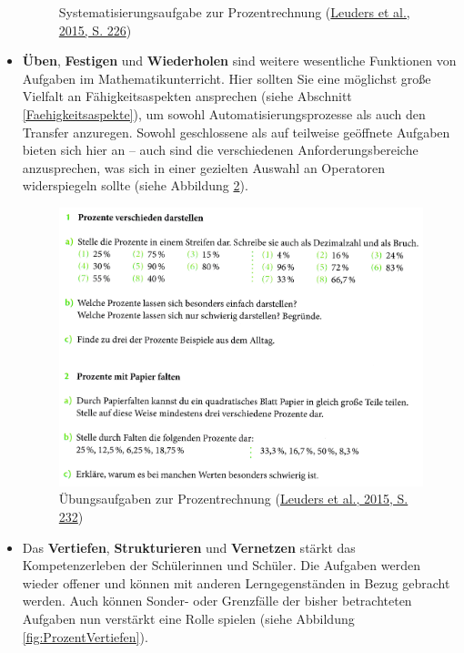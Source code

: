 \documentclass[
  ngerman,
]{scrbook}
\theoremstyle{definition}
\theoremstyle{definition}
\theoremstyle{definition}
\theoremstyle{definition}
\theoremstyle{remark}
\begin{document}
\begin{itemize}
\begin{figure}
{    }

    \caption{Systematisierungsaufgabe zur Prozentrechnung (\protect\hyperlink{ref-Barzel2015a}{Leuders et al., 2015, S. 226})}\label{fig:ProzentSammeln}
    \end{figure}
\item
  \textbf{Üben}, \textbf{Festigen} und \textbf{Wiederholen} sind weitere wesentliche Funktionen von Aufgaben im Mathematikunterricht. Hier sollten Sie eine möglichst große Vielfalt an Fähigkeitsaspekten ansprechen (siehe Abschnitt \ref{Faehigkeitsaspekte}), um sowohl Automatisierungsprozesse als auch den Transfer anzuregen. Sowohl geschlossene als auf teilweise geöffnete Aufgaben bieten sich hier an -- auch sind die verschiedenen Anforderungsbereiche anzusprechen, was sich in einer gezielten Auswahl an Operatoren widerspiegeln sollte (siehe Abbildung \ref{fig:ProzentUeben}).

  \begin{figure}

    {\centering \includegraphics[width=0.75\linewidth]{pictures/10-ProzentUeben} 

    }

    \caption{Übungsaufgaben zur Prozentrechnung (\protect\hyperlink{ref-Barzel2015a}{Leuders et al., 2015, S. 232})}\label{fig:ProzentUeben}
    \end{figure}
\item
  Das \textbf{Vertiefen}, \textbf{Strukturieren} und \textbf{Vernetzen} stärkt das Kompetenzerleben der Schülerinnen und Schüler. Die Aufgaben werden wieder offener und können mit anderen Lerngegenständen in Bezug gebracht werden. Auch können Sonder- oder Grenzfälle der bisher betrachteten Aufgaben nun verstärkt eine Rolle spielen (siehe Abbildung \ref{fig:ProzentVertiefen}).

  \begin{figure}


\end{figure}
\end{itemize}
\end{document}
